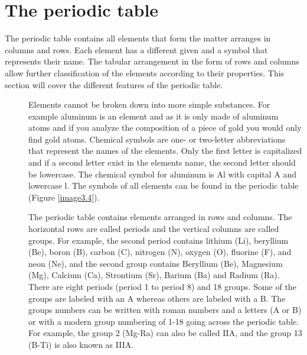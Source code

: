 \documentclass[main.tex]{subfiles}
\begin{document}
\section{The periodic table}
The periodic table contains all elements that form the matter arranges in columns and rows. Each element has a different given and a symbol that represents their name. The tabular arrangement in the form of rows and columns allow further classification of the elements according to their properties. This section will cover the different features of the periodic table.
\sloppy
\begin{description}
\item[] Elements cannot be broken down into more simple substances. For example aluminum is an element and as it is only made of aluminum atoms and if you analyze the composition of a piece of gold you would only find gold atoms. Chemical symbols are one- or two-letter abbreviations that represent the names of the elements. Only the first letter is capitalized and if a second letter exist in the element\textquotesingle s name, the second letter should be lowercase. The chemical symbol for aluminum is Al with capital A and lowercase l. The symbols of all elements can be found in the periodic table (Figure \ref{image3.4}).

\item[] The periodic table contains elements arranged in rows and columns. The horizontal rows are called periods and the vertical columns are called groups. For example, the  second period contains lithium (Li), beryllium (Be), boron (B), carbon (C), nitrogen (N), oxygen (O), fluorine (F), and neon (Ne), and the second group contains Beryllium (Be), Magnesium (Mg), Calcium (Ca), Strontium (Sr), Barium (Ba) and Radium (Ra). There are eight periods (period 1 to period 8) and 18 groups. Some of the groups are labeled with an A whereas others are labeled with a B. The groups numbers can be written with roman numbers and a letters (A or B) or with a modern group numbering of 1-18 going across the periodic table. For example, the group 2 (Mg-Ra) can also be called IIA, and the group 13 (B-Ti) is also known as IIIA.


\begin{figure}[h] %
\newcommand{\CommonElementTextFormat}[4]
{
  \begin{minipage}{2.5cm}
    \centering
      {\textbf{#1} \hfill #2}%
      \linebreak \linebreak
      {\textbf{#3}}%
      \linebreak \linebreak
      {{#4}}
  \end{minipage}
}


\end{figure}
\end{description}
\end{document}
